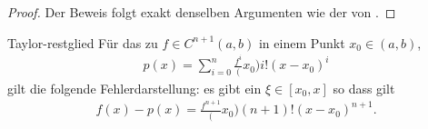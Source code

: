 \begin{proof}
  Der Beweis folgt exakt denselben Argumenten wie der von
  .
\end{proof}

\begin{Korollar}{Taylor-restglied}
  Für das  zu $f\in C^{n+1}(a,b)$ in einem
  Punkt $x_0\in(a,b)$,
  \begin{gather}
    p(x) = \sum_{i=0}^n \frac{f^{i}}(x_0){i!} (x-x_0)^i
  \end{gather}
  gilt die folgende Fehlerdarstellung: es gibt ein $\xi\in[x_0,x]$ so dass gilt
  \begin{gather}
    f(x) - p(x) = \frac{f^{n+1}}(x_0){(n+1)!} (x-x_0)^{n+1}.
  \end{gather}
\end{Korollar}

